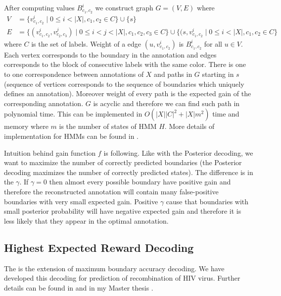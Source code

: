 After computing values $B^i_{c_1,c_2}$ we construct graph $G=(V,E)$ where
\begin{align*}
V&=\{v^i_{c_1,c_2}\mid 0\leq i<|X|,c_1,c_2\in C\}\cup\{s\}\\
E&=\{(v^i_{c_1,c_2},v^j_{c_2,c_3})\mid 0\leq i<j< |X|, c_1,c_2,c_3\in C
\}\cup\{(s,v^i_{c_1,c_2}\mid 0\leq i< |X|, c_1,c_2\in C\} 
\end{align*}
where $C$ is the set
of labels. Weight of a edge $(u,v^i_{c_1,c_2})$ is $B^i_{c_1,c_2}$ for all $u\in
V$. Each vertex corresponds to the boundary in the annotation and edges
corresponds to the  block of consecutive labels with the same
color.
There is one to one correspondence between annotations of $X$ and paths in
$G$ starting in $s$ (sequence of vertices corresponds to the sequence of
boundaries which uniquely defines an annotation). Moreover weight of every path
is the expected gain of
the corresponding annotation. $G$ is acyclic and therefore we can find such path in
polynomial time. This can be implemented in $O(|X||C|^2+|X|m^2)$ time and memory
where $m$ is the number of states of HMM $H$. More details of implementation
for HMMs can be found in
\cite{Nanasi2010mgr}.

Intuition behind gain function $f$ is following. Like with the Posterior
decoding, we want to maximize the number of correctly predicted boundaries (the
Posterior decoding maximizes the number of correctly predicted states). The
difference is in the $\gamma$. If $\gamma=0$ then almost every possible boundary
have positive gain and therefore the reconstructed annotation will contain many
false-positive boundaries with very small expected gain. Positive $\gamma$ cause
that boundaries with small posterior probability will have negative expected
gain and therefore it is less likely that they appear in the optimal annotation.


\subsection{Highest Expected Reward Decoding}\label{SECTION:HERD}

The  is the extension of maximum
boundary accuracy decoding. We have developed this decoding for prediction of
recombination of HIV virus.  Further details can be found in \cite{Nanasi2010}
and in my Master thesis \cite{Nanasi2010mgr}.


